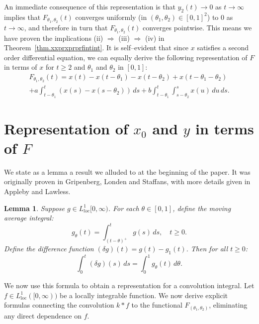 \documentclass[10pt,reqno]{amsart}
\newtheorem{lemma}[theorem]{Lemma}
\theoremstyle{definition}
\begin{document}
	An immediate consequence of this representation is that $y_2(t)\to 0$ as $t\to\infty$ implies that $F_{\theta_1,\theta_2}(t)$ converges uniformly (in $(\theta_1,\theta_2)\in [0,1]^2$) to $0$ as $t\to\infty$, and therefore in turn that $F_{\theta_1,\theta_2}(t)$ converges pointwise. This means we have proven the implications (ii) $\Rightarrow$ (iii) $\Rightarrow$ (iv) in Theorem~\ref{thm.xxprxprprfintint}. %
	It is self--evident that since $x$ satisfies a second order differential equation, we can equally derive the following representation of $F$ in terms of $x$ for $t\geq 2$ and $\theta_1$ and $\theta_2$ in $[0,1]$:
	\begin{multline} \label{eq.Frepx}
		F_{\theta_1,\theta_2}(t)=
		x(t) - x(t-\theta_1) - x(t-\theta_2) + x(t-\theta_1-\theta_2) \\
		+ a \int_{t-\theta_1}^t (x(s) - x(s-\theta_2)) \, ds + b\int_{t-\theta_1}^t \int_{s-\theta_2}^s x(u) \, du \, ds.
	\end{multline}
	
	\section{Representation of $x_0$ and $y$ in terms of $F$}
	We state as a lemma a result we alluded to at the beginning of the paper. It was originally proven in Gripenberg, Londen and Staffans, with more details given in Appleby and Lawless. 
	\begin{lemma} \label{lemma:delta_integral}
		Suppose $g \in L_{loc}^1[0, \infty)$. For each $\theta \in [0, 1]$, define the moving average integral:
		\[
		g_\theta(t) = \int_{(t-\theta)^+}^t g(s) \, ds, \quad t \ge 0.
		\]
		Define the difference function $(\delta g)(t) = g(t) - g_1(t)$.
		Then for all $t \ge 0$:
		\begin{equation}
			\int_0^t (\delta g)(s) \, ds = \int_0^1 g_\theta(t) \, d\theta.
		\end{equation}
	\end{lemma}
	We now use this formula to obtain a representation for a convolution integral.
	Let $f \in L^1_{\text{loc}}([0, \infty))$ be a locally integrable function. %
	We now derive explicit formulas connecting the convolution $k * f$ to the functional $F_{(\theta_1,\theta_2)}$, eliminating any direct dependence on $f$. 
	
\end{document}
